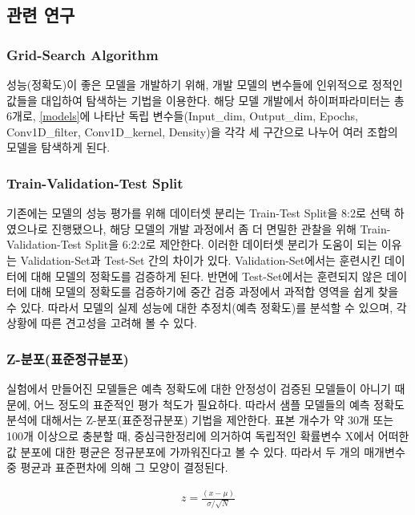 \documentclass{kcc}
\begin{document}
\subsection{관련 연구}

\subsubsection{Grid-Search Algorithm}
성능(정확도)이 좋은 모델을 개발하기 위해, 개발 모델의 변수들에 인위적으로 정적인 값들을 대입하여 탐색하는 기법\cite{cite:grid}을 이용한다.
해당 모델 개발에서 하이퍼파라미터는 총 6개로, \ref{models}에 나타난 독립 변수들(Input\_dim, Output\_dim, Epochs, Conv1D\_filter, Conv1D\_kernel, Density)을 각각 세 구간으로 나누어 여러 조합의 모델을 탐색하게 된다.

\subsubsection{Train-Validation-Test Split}
기존에는 모델의 성능 평가를 위해 데이터셋 분리는 Train-Test Split을 8:2로 선택 하였으나\cite{cite:split}로 진행됐으나, 해당 모델의 개발 과정에서 좀 더 면밀한 관찰을 위해 Train-Validation-Test Split을  6:2:2로 제안한다.
이러한 데이터셋 분리가 도움이 되는 이유는 Validation-Set과 Test-Set 간의 차이가 있다. Validation-Set에서는 훈련시킨 데이터에 대해 모델의 정확도를 검증하게 된다. 반면에 Test-Set에서는 훈련되지 않은 데이터에 대해 모델의 정확도를 검증하기에 중간 검증 과정에서 과적합 영역\cite{cite:SplittingData}을 쉽게 찾을 수 있다. 따라서 모델의 실제 성능에 대한 추정치(예측 정확도)를 분석할 수 있으며, 각 상황에 따른 견고성을 고려해 볼 수 있다.

\subsubsection{Z-분포(표준정규분포)}
실험에서 만들어진 모델들은 예측 정확도에 대한 안정성이 검증된 모델들이 아니기 때문에, 어느 정도의 표준적인 평가 척도가 필요하다. 따라서 샘플 모델들의 예측 정확도 분석에 대해서는 Z-분포(표준정규분포) 기법을 제안한다.
표본 개수가 약 30개 또는 100개 이상으로 충분할 때, 중심극한정리\cite{cite:CentralLimit}에 의거하여 독립적인 확률변수 X에서 어떠한 값 분포에 대한 평균은 정규분포에 가까워진다고 볼 수 있다\cite{cite:Probability}. 따라서 두 개의 매개변수 중 평균과 표준편차에 의해 그 모양이 결정된다.

\begin{eqnarray}
z = \frac{(x - \mu)}{\sigma / \sqrt{N}}
\end{eqnarray}
\end{document}
